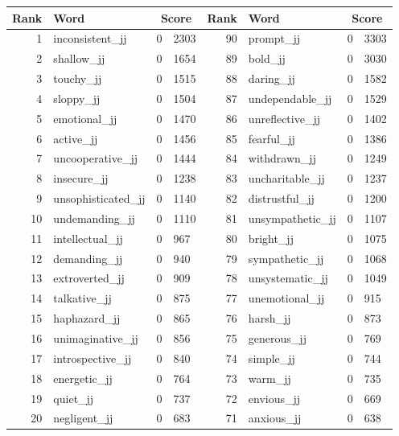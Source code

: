 \begin{table}[tbp]
    \begin{tabular}{| rlr@{.}l | rlr@{.}l |}
    \hline
    \textbf{Rank} & \textbf{Word} & \multicolumn{2}{c|}{\textbf{Score}} & \textbf{Rank} & \textbf{Word} & \multicolumn{2}{c|}{\textbf{Score}} \\
    \hline
    1 & inconsistent\_jj & 0 & 2303    &    90 & prompt\_jj & 0 & 3303 \\
    2 & shallow\_jj & 0 & 1654    &    89 & bold\_jj & 0 & 3030 \\
    3 & touchy\_jj & 0 & 1515    &    88 & daring\_jj & 0 & 1582 \\
    4 & sloppy\_jj & 0 & 1504    &    87 & undependable\_jj & 0 & 1529 \\
    5 & emotional\_jj & 0 & 1470    &    86 & unreflective\_jj & 0 & 1402 \\
    6 & active\_jj & 0 & 1456    &    85 & fearful\_jj & 0 & 1386 \\
    7 & uncooperative\_jj & 0 & 1444    &    84 & withdrawn\_jj & 0 & 1249 \\
    8 & insecure\_jj & 0 & 1238    &    83 & uncharitable\_jj & 0 & 1237 \\
    9 & unsophisticated\_jj & 0 & 1140    &    82 & distrustful\_jj & 0 & 1200 \\
    10 & undemanding\_jj & 0 & 1110    &    81 & unsympathetic\_jj & 0 & 1107 \\
    11 & intellectual\_jj & 0 & 967    &    80 & bright\_jj & 0 & 1075 \\
    12 & demanding\_jj & 0 & 940    &    79 & sympathetic\_jj & 0 & 1068 \\
    13 & extroverted\_jj & 0 & 909    &    78 & unsystematic\_jj & 0 & 1049 \\
    14 & talkative\_jj & 0 & 875    &    77 & unemotional\_jj & 0 & 915 \\
    15 & haphazard\_jj & 0 & 865    &    76 & harsh\_jj & 0 & 873 \\
    16 & unimaginative\_jj & 0 & 856    &    75 & generous\_jj & 0 & 769 \\
    17 & introspective\_jj & 0 & 840    &    74 & simple\_jj & 0 & 744 \\
    18 & energetic\_jj & 0 & 764    &    73 & warm\_jj & 0 & 735 \\
    19 & quiet\_jj & 0 & 737    &    72 & envious\_jj & 0 & 669 \\
    20 & negligent\_jj & 0 & 683    &    71 & anxious\_jj & 0 & 638 \\

\end{tabular}
\end{table}
